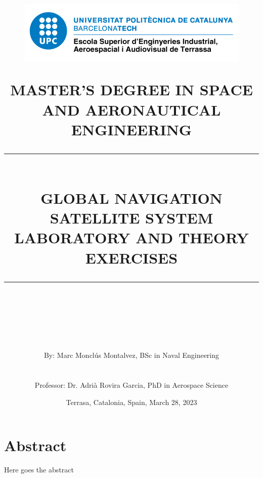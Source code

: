 \documentclass[10pt]{book}
\title{
\begin{figure}[H]
        \centering
        \includegraphics[scale=0.35]{Figures/logo_eseiaat.png}
\end{figure}


\textsc{\Large MASTER'S DEGREE IN SPACE AND AERONAUTICAL ENGINEERING} \\
[15pt] 
\rule{\linewidth}{0.5pt} \\[6pt] 
\huge GLOBAL NAVIGATION SATELLITE SYSTEM\\
LABORATORY AND THEORY EXERCISES 
\rule{\linewidth}{1pt}  \\[15pt]
\\}
\author{
By: Marc Monclús Montalvez, BSc in Naval Engineering\\
\\
\\
Professor: Dr. Adrià Rovira Garcia, PhD in Aerospace Science\\
}
\date{\normalsize Terrasa, Catalonia, Spain, March 28, 2023}
\begin{document}
\renewcommand{\listfigurename}{List of figures}
\renewcommand{\listtablename}{List of tables}
\renewcommand{\contentsname}{Contents}
\renewcommand{\figurename}{Figure}
\renewcommand{\tablename}{Table}
\renewcommand{\chaptername}{Chapter}
\renewcommand{\bibname}{Bibliography}




\pagestyle{\thepage}
\restoregeometry

\thispagestyle{empty} 
\newpage





\clearpage  %
\vspace*{\fill}
\newpage


\section{Abstract}
Here goes the abstract



\clearpage  %
\newpage



\newpage
\tableofcontents  %
\newpage


\tableofcontents 
\clearpage
\end{document}
